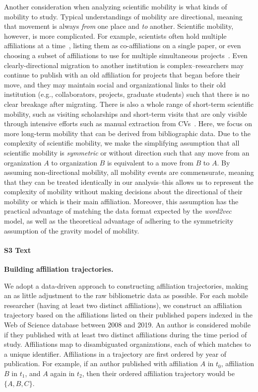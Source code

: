 \documentclass[12pt]{article} %
\begin{document}
Another consideration when analyzing scientific mobility is what kinds of mobility to study.
Typical understandings of mobility are directional, meaning that movement is always \textit{from} one place and \textit{to} another.
Scientific mobility, however, is more complicated.
For example, scientists often hold multiple affiliations at a time~\autocite{markova2016synchronous}, listing them as co-affiliations on a single paper, or even choosing a subset of affiliations to use for multiple simultaneous projects~\autocite{robinson2019mobility}.
Even clearly-directional migration to another institution is complex--researchers may continue to publish with an old affiliation for projects that began before their move, and they may maintain social and organizational links to their old institution (e.g., collaborators, projects, graduate students) such that there is no clear breakage after migrating.
There is also a whole range of short-term scientific mobility, such as visiting scholarships and short-term visits that are only visible through intensive efforts such as manual extraction from CVs~\autocite{woolley2009cv, sandstrom2009cv, canibano2011temporary}.
Here, we focus on more long-term mobility that can be derived from bibliographic data.
Due to the complexity of scientific mobility, we make the simplifying assumption that all scientific mobility is \textit{symmetric} or without direction such that any move from an organization $A$ to organization $B$ is equivalent to a move from $B$ to $A$.
By assuming non-directional mobility, all mobility events are commensurate, meaning that they can be treated identically in our analysis--this allows us to represent the complexity of mobility without making decisions about the directional of their mobility or which is their main affiliation.
Moreover, this assumption has the practical advantage of matching the data format expected by the \textit{word2vec} model, as well as the theoretical advantage of adhering to the symmetricity assumption of the gravity model of mobility.



%
\paragraph*{S3 Text}
\label{si:text:mobility_traj}
{\bf Building affiliation trajectories.}

We adopt a data-driven approach to constructing affiliation trajectories, making an as little adjustment to the raw bibliometric data as possible.
For each mobile researcher (having at least two distinct affiliations), we construct an affiliation trajectory based on the affiliations listed on their published papers indexed in the Web of Science database between 2008 and 2019.
An author is considered mobile if they published with at least two distinct affiliations during the time period of study.
Affiliations map to disambiguated organizations, each of which matches to a unique identifier.
Affiliations in a trajectory are first ordered by year of publication.
For example, if an author published with affiliation $A$ in $t_{0}$, affiliation $B$ in $t_{1}$, and $A$ again in $t_{2}$, then their ordered affiliation trajectory would be $\{A, B, C\}$.
\end{document}
